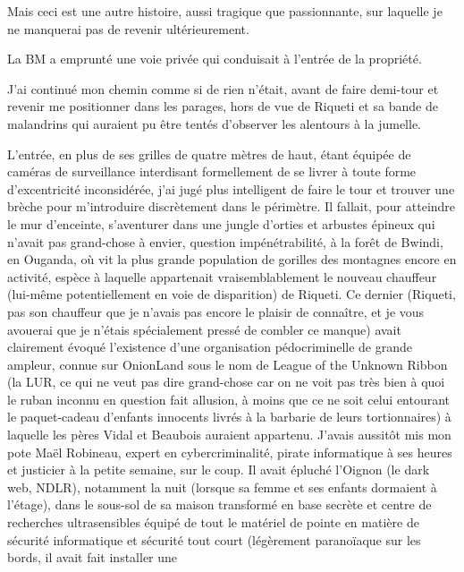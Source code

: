 Mais ceci est une autre histoire, aussi tragique que passionnante, sur laquelle je ne manquerai pas de revenir ultérieurement.

La BM a emprunté une voie privée qui conduisait à l’entrée de la propriété.

J’ai continué mon chemin comme si de rien n’était, avant de faire demi-tour et revenir me positionner dans les parages, hors de vue de Riqueti et sa bande de malandrins qui auraient pu être tentés d’observer les alentours à la jumelle.

\illusloflabel{}%
L’entrée, en plus de ses grilles de quatre mètres de haut, étant équipée de caméras de surveillance interdisant formellement de se livrer à toute forme d’excentricité inconsidérée, j’ai jugé plus intelligent de faire le tour et trouver une brèche pour m’introduire discrètement dans le périmètre. Il fallait, pour atteindre le mur d’enceinte, s’aventurer dans une jungle d’orties et arbustes épineux qui n’avait pas grand-chose à envier, question impénétrabilité, à la forêt de Bwindi, en Ouganda, où vit la plus grande population de gorilles des montagnes encore en activité, espèce à laquelle appartenait vraisemblablement le nouveau chauffeur (lui-même potentiellement en voie de disparition) de Riqueti. Ce dernier (Riqueti, pas son chauffeur que je n’avais pas encore le plaisir de connaître, et je vous avouerai que je n’étais spécialement pressé de combler ce manque) avait clairement évoqué l’existence d’une organisation pédocriminelle de grande ampleur, connue sur OnionLand sous le nom de League of the Unknown Ribbon (la LUR, ce qui ne veut pas dire grand-chose car on ne voit pas très bien à quoi le ruban inconnu en question fait allusion, à moins que ce ne soit celui entourant le paquet-cadeau d’enfants innocents livrés à la barbarie de leurs tortionnaires) à laquelle les pères Vidal et Beaubois auraient appartenu. J’avais aussitôt mis mon pote Maël Robineau, expert en cybercriminalité, pirate informatique à ses heures et justicier à la petite semaine, sur le coup. Il avait épluché l’Oignon (le dark web, NDLR), notamment la nuit (lorsque sa femme et ses enfants dormaient à l’étage), dans le sous-sol de sa maison transformé en base secrète et centre de recherches ultrasensibles équipé de tout le matériel de pointe en matière de sécurité informatique et sécurité tout court (légèrement paranoïaque sur les bords, il avait fait installer une 